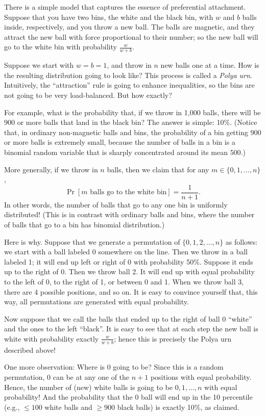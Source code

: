 \documentclass[11pt]{article}
\begin{document}
There is a simple model that captures the essence of preferential attachment. Suppose that you have two bins, the white and the black bin, with $w$ and $b$ balls inside, respectively, and you throw a new ball. The balls are magnetic, and they attract the new ball with force proportional to their number; so the new ball will go to the white bin with probability $\frac{w}{w+b}$.

Suppose we start with $w = b = 1$, and throw in $n$ new balls one at a time. How is the resulting distribution going to look like? This process is called a {\em Polya urn}. Intuitively, the ``attraction'' rule is going to enhance inequalities, so the bins are not going to be very load-balanced. But how exactly?

For example, what is the probability that, if we throw in 1,000 balls, there will be 900 or more balls that land in the black bin? The answer is simple: 10\%. (Notice that, in ordinary non-magnetic balls and bins, the probability of a bin getting 900 or more balls is extremely small, because the number of balls in a bin is a binomial random variable that is sharply concentrated around its mean $500$.)

More generally, if we throw in $n$ balls, then we claim that for any $m \in \{0,1,\dots,n\}$,
$$\Pr[m \text{ balls go to the white bin}] = \frac{1}{n+1}.$$
In other words, the number of balls that go to any one bin is uniformly distributed! (This is in contrast with ordinary balls and bins, where the number of balls that go to a bin has binomial distribution.)


Here is why. Suppose that we generate a permutation of $\{0,1, 2, \dots, n\}$ as follows: we start with a ball labeled 0 somewhere on the line. Then we throw in a ball labeled 1; it will end up left or right of 0 with probability 50\%. Suppose it ends up to the right of 0. Then we throw ball 2. It will end up with equal probability to the left of 0, to the right of 1, or between 0 and 1. When we throw ball 3, there are 4 possible positions, and so on. It is easy to convince yourself that, this way, all permutations are generated with equal probability.

Now suppose that we call the balls that ended up to the right of ball 0 ``white'' and the ones to the left ``black''. It is easy to see that at each step the new ball is white with probability exactly $\frac{w}{w+b}$; hence this is precisely the Polya urn described above!

One more observation: Where is 0 going to be? Since this is a random permutation, 0 can be at any one of the $n + 1$ positions with equal probability. Hence, the number of (new) white balls is going to be $0,1,\dots,n$ with equal probability! And the probability that the 0 ball will end up in the 10 percentile (e.g., $\le 100$ white balls and $\ge 900$ black balls) is exactly 10\%, as claimed.
\end{document}
